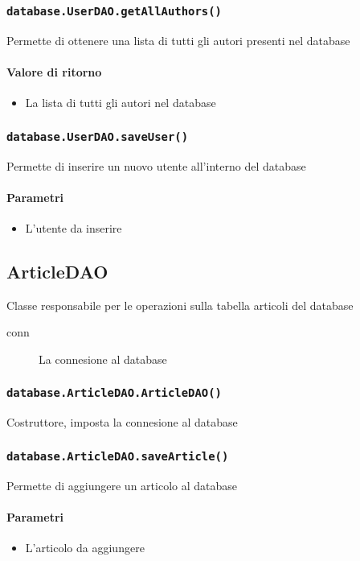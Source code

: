 \subsubsection{\texttt{database.UserDAO.getAllAuthors()}} Permette
di ottenere una lista di tutti gli autori presenti nel database
\paragraph{Valore di ritorno}
\begin{itemize}
\item La lista di tutti gli autori nel database
\end{itemize}

\subsubsection{\texttt{database.UserDAO.saveUser()}} Permette di
inserire un nuovo utente all'interno del database
\paragraph{Parametri}
\begin{itemize}
\item L'utente da inserire
\end{itemize}


\subsection{ArticleDAO}
Classe responsabile per le operazioni sulla tabella articoli del database
\begin{description}
\item[conn] La connesione al database
\end{description}

\subsubsection{\texttt{database.ArticleDAO.ArticleDAO()}}
Costruttore, imposta la connesione al database

\subsubsection{\texttt{database.ArticleDAO.saveArticle()}}
Permette di aggiungere un articolo al database
\paragraph{Parametri}
\begin{itemize}
\item L'articolo da aggiungere
\end{itemize}
